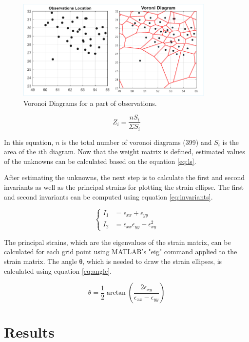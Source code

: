 \documentclass[12pt]{article}
\begin{document}
	\begin{figure}[h!]
		\centering
		\includegraphics[height=5cm]{./Plots/Voronoi.pdf}
		\caption{Voronoi Diagrams for a part of observations.}
		\label{fig:voronoi}
	\end{figure}
	
	\begin{equation}
		Z_i = \frac{nS_i}{\Sigma{S_i}}
		\label{eq:voronoi}
	\end{equation}
	
	In this equation, $n$ is the total number of voronoi diagrams (399) and $S_i$ is the area of the $i$th diagram. Now that the weight matrix is defined, estimated values of the unknowns can be calculated based on the equation \ref{eq:ls}.
	
	After estimating the unknowns, the next step is to calculate the first and second invariants as well as the principal strains for plotting the strain ellipse. The first and second invariants can be computed using equation \ref{eq:invariants}.
	
	\begin{equation}
		\begin{cases}
			I_1 &= \epsilon_{xx} + \epsilon_{yy}\\
			I_2 &= \epsilon_{xx} \epsilon_{yy} - \epsilon_{xy}^2
		\end{cases}
		\label{eq:invariants}
	\end{equation}
	
	The principal strains, which are the eigenvalues of the strain matrix, can be calculated for each grid point using MATLAB’s "eig" command applied to the strain matrix. The angle θ, which is needed to draw the strain ellipses, is calculated using equation \ref{eq:angle}.
	
	\begin{equation}
		\theta = \frac{1}{2} \arctan{\left(\frac{2\epsilon_{xy}}{\epsilon_{xx} - \epsilon_{yy}}\right)}
		\label{eq:angle}
	\end{equation}
	
	\section{Results}
	
\end{document}
